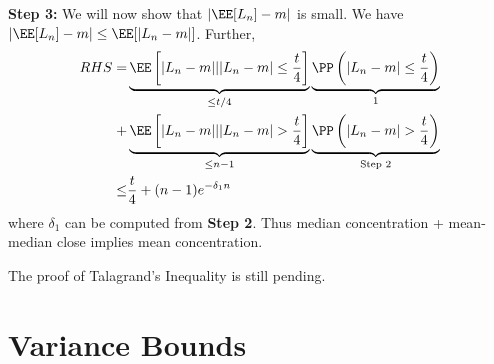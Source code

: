 \textbf{Step 3:} We will now show that $|\EE[L_n] - m|$ is small. We have $|\EE[L_n] - m| \leq \EE[|L_n - m|]$. Further,
\begin{align*}
RHS = &\underbrace{\EE\left[|L_n - m| | |L_n-m| \leq \frac t4\right] }_{\leq t/4}\underbrace{\PP\left(|L_n-m| \leq \frac t4 \right)}_{1}\\ +  &\underbrace{\EE\left[|L_n - m| | |L_n-m| > \frac t4\right]}_{\leq n-1} \underbrace{\PP\left(|L_n-m| > \frac t4\right)}_{\text{Step 2}} \\
\leq &\frac{t}{4} + (n-1)e^{-\delta_1 n}
\end{align*}
where $\delta_1$ can be computed from \textbf{Step 2}. Thus median concentration + mean-median close implies mean concentration.
\begin{remark}
The proof of Talagrand's Inequality is still pending.
\end{remark}
\section{Variance Bounds}
